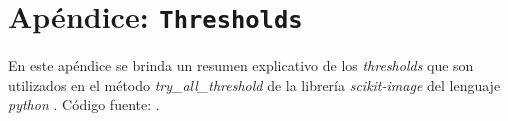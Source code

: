 \newcommand{\mychapter}[2]{
    \setcounter{chapter}{#1}
    \setcounter{section}{0}
    \chapter*{#2}	
}

\singlespacing
\mychapter{0}{Apéndice: \texttt{Thresholds}}
\label{chap:apendthresh}

En este apéndice se brinda un resumen explicativo de los \textit{thresholds} que son utilizados en el método \textit{try\_all\_threshold} de la librería \textit{scikit-image} del lenguaje \textit{python} \cite{van2014scikit}.
Código fuente: \href{https://github.com/scikit-image/scikit-image/blob/master/skimage/filters/thresholding.py}{\faGithub}.

